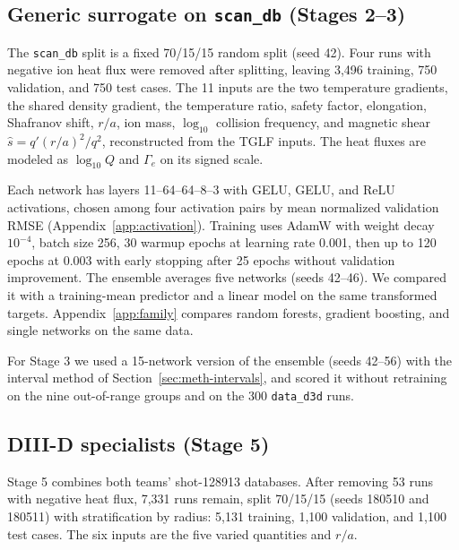 \documentclass[12pt,letterpaper]{article}
\begin{document}
\subsection{Generic surrogate on \texttt{scan\_db} (Stages 2--3)}
\label{sec:meth-generic}

The \texttt{scan\_db} split is a fixed 70/15/15 random split (seed 42). Four runs with
negative ion heat flux were removed after splitting, leaving 3,496 training, 750 validation,
and 750 test cases. The 11 inputs are the two temperature gradients, the shared density
gradient, the temperature ratio, safety factor, elongation, Shafranov shift, $r/a$, ion
mass, $\log_{10}$ collision frequency, and magnetic shear
$\hat{s} = q' (r/a)^2 / q^2$, reconstructed from the TGLF inputs. The heat fluxes are
modeled as $\log_{10}Q$ and $\Gamma_e$ on its signed scale.

Each network has layers 11--64--64--8--3 with GELU, GELU, and ReLU activations, chosen
among four activation pairs by mean normalized validation RMSE (Appendix~\ref{app:activation}).
Training uses AdamW with weight decay $10^{-4}$, batch size 256, 30 warmup epochs at
learning rate 0.001, then up to 120 epochs at 0.003 with early stopping after 25 epochs
without validation improvement. The ensemble averages five networks (seeds 42--46). We
compared it with a training-mean predictor and a linear model on the same transformed
targets. Appendix~\ref{app:family} compares random forests, gradient boosting, and single
networks on the same data.

For Stage 3 we used a 15-network version of the ensemble (seeds 42--56) with the interval
method of Section~\ref{sec:meth-intervals}, and scored it without retraining on the nine
out-of-range groups and on the 300 \texttt{data\_d3d} runs.

\subsection{DIII-D specialists (Stage 5)}
\label{sec:meth-specialists}

Stage 5 combines both teams' shot-128913 databases. After removing 53 runs with negative
heat flux, 7,331 runs remain, split 70/15/15 (seeds 180510 and 180511) with stratification
by radius: 5,131 training, 1,100 validation, and 1,100 test cases. The six inputs are the
five varied quantities and $r/a$.
\end{document}
